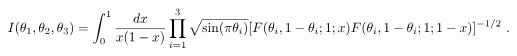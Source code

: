 \begin{equation}
I(\theta_1,\theta_2,\theta_3)=
\int_0^1 {dx\over x(1-x)}
\prod_{i=1}^3 \sqrt{\sin (\pi \theta_i)}
[ F(\theta_i , 1-\theta_i; 1; x)
F(\theta_i , 1-\theta_i; 1; 1-x) ]^{-1/2}
\ .
\end{equation}

